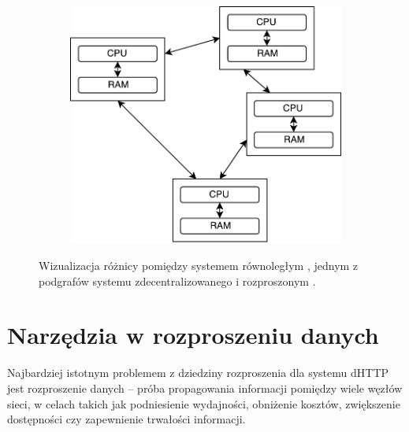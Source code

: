 \begin{figure}[h]
\begin{subfigure}{0.6\textwidth}
		\centering
		\includegraphics[scale=0.5]{distributed.pdf}
		\subcaption{\label{subfigure_c}}
	\end{subfigure}
	
	\caption{\label{fig:concurrentVsParalell}Wizualizacja różnicy pomiędzy systemem równoległym \protect{}, jednym z podgrafów systemu zdecentralizowanego \protect{} i rozproszonym \protect{}.}

\end{figure}


\section{Narzędzia w rozproszeniu danych}
\label{sec:narzedzia}
Najbardziej istotnym problemem z dziedziny rozproszenia dla systemu dHTTP jest rozproszenie danych -- próba propagowania informacji pomiędzy wiele węzłów sieci, w celach takich jak podniesienie wydajności, obniżenie kosztów, zwiększenie dostępności czy zapewnienie trwałości informacji.



